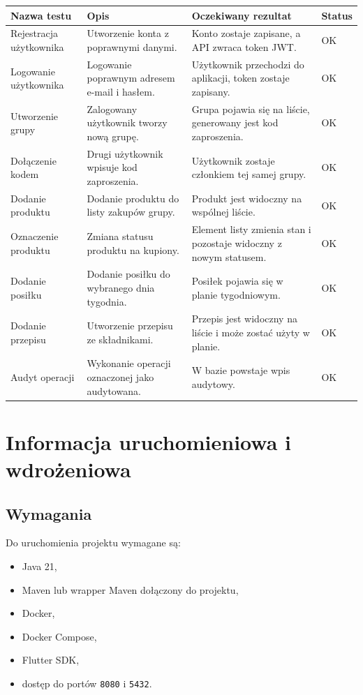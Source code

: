 \documentclass[12pt,a4paper]{article}
\begin{document}
\begin{longtable}{|p{}|p{}|p{}|p{}|}
\hline
\textbf{Nazwa testu} & \textbf{Opis} & \textbf{Oczekiwany rezultat} & \textbf{Status} \\
\hline
Rejestracja użytkownika & Utworzenie konta z poprawnymi danymi. & Konto zostaje zapisane, a API zwraca token JWT. & OK \\
\hline
Logowanie użytkownika & Logowanie poprawnym adresem e-mail i hasłem. & Użytkownik przechodzi do aplikacji, token zostaje zapisany. & OK \\
\hline
Utworzenie grupy & Zalogowany użytkownik tworzy nową grupę. & Grupa pojawia się na liście, generowany jest kod zaproszenia. & OK \\
\hline
Dołączenie kodem & Drugi użytkownik wpisuje kod zaproszenia. & Użytkownik zostaje członkiem tej samej grupy. & OK \\
\hline
Dodanie produktu & Dodanie produktu do listy zakupów grupy. & Produkt jest widoczny na wspólnej liście. & OK \\
\hline
Oznaczenie produktu & Zmiana statusu produktu na kupiony. & Element listy zmienia stan i pozostaje widoczny z nowym statusem. & OK \\
\hline
Dodanie posiłku & Dodanie posiłku do wybranego dnia tygodnia. & Posiłek pojawia się w planie tygodniowym. & OK \\
\hline
Dodanie przepisu & Utworzenie przepisu ze składnikami. & Przepis jest widoczny na liście i może zostać użyty w planie. & OK \\
\hline
Audyt operacji & Wykonanie operacji oznaczonej jako audytowana. & W bazie powstaje wpis audytowy. & OK \\
\hline
\end{longtable}

\section{Informacja uruchomieniowa i wdrożeniowa}

\subsection{Wymagania}

Do uruchomienia projektu wymagane są:

\begin{itemize}
    \item Java 21,
    \item Maven lub wrapper Maven dołączony do projektu,
    \item Docker,
    \item Docker Compose,
    \item Flutter SDK,
    \item dostęp do portów \texttt{8080} i \texttt{5432}.
\end{itemize}
\end{document}
